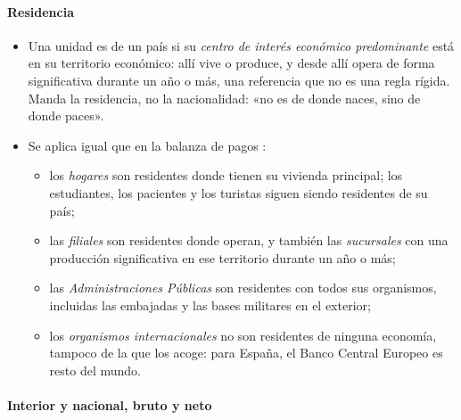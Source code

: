 \documentclass[11pt]{article}
\begin{document}
\begin{infografia}[H]
\centering
\caption{De los factores al precio de mercado: los impuestos y las subvenciones ligados a la producción (España, 2025, millones de euros)}\label{figu:escalera-impuestos}
\end{infografia}

\paragraph{Residencia}

\begin{itemize}
\item Una unidad es  de un país si su \emph{centro de interés económico predominante} está en su territorio económico: allí vive o produce, y desde allí opera de forma significativa durante un año o más, una referencia que no es una regla rígida\nocite{SEC2010}. Manda la residencia, no la nacionalidad: «no es de donde naces, sino de donde paces».
\item Se aplica igual que en la balanza de pagos :
  \begin{itemize}
  \item los \emph{hogares} son residentes donde tienen su vivienda principal; los estudiantes, los pacientes y los turistas siguen siendo residentes de su país;
  \item las \emph{filiales} son residentes donde operan, y también las \emph{sucursales} con una producción significativa en ese territorio durante un año o más;
  \item las \emph{Administraciones Públicas} son residentes con todos sus organismos, incluidas las embajadas y las bases militares en el exterior;
  \item los \emph{organismos internacionales} no son residentes de ninguna economía, tampoco de la que los acoge: para España, el Banco Central Europeo es resto del mundo.
  \end{itemize}
\end{itemize}

\paragraph{Interior y nacional, bruto y neto}
\end{document}
